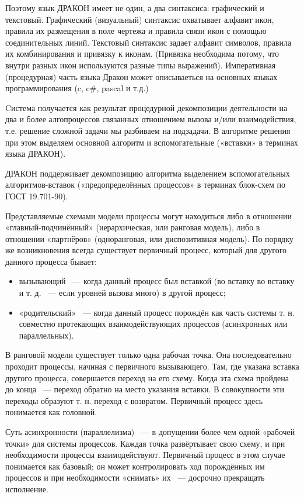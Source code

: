 Поэтому язык ДРАКОН имеет не один, а два синтаксиса: графический и текстовый.
Графический (визуальный) синтаксис охватывает алфавит икон, правила их размещения в поле чертежа и правила связи икон с помощью соединительных линий. Текстовый синтаксис задает алфавит символов, правила их комбинирования и привязку к иконам. (Привязка необходима потому, что внутри разных икон используются разные типы выражений). Императивная (процедурная) часть языка Дракон может описываеться на основных языках программирования (c, c\#, pascal и т.д.)

Cистема получается как результат процедурной декомпозиции деятельности на два и более алгопроцессов связанных отношением вызова и/или взаимодействия, т.е. решение сложной задачи мы разбиваем на подзадачи. В алгоритме решения при этом выделяем основной алгоритм и вспомогательные («вставки» в терминах языка ДРАКОН).

ДРАКОН поддерживает декомпозицию алгоритма выделением вспомогательных алгоритмов-вставок («предопределённых процессов» в терминах блок-схем по ГОСТ 19.701-90).

Представляемые схемами модели процессы могут находиться либо в отношении «главный-подчинённый» (иерархическая, или ранговая модель), либо в отношении «партнёров» (одноранговая, или диспозитивная модель). По порядку же возникновения всегда существует первичный процесс, который для другого данного процесса бывает:
\begin{itemize}
\item вызывающий ~--- когда данный процесс был вставкой (во вставку во вставку и т. д. ~--- если уровней вызова много) в другой процесс;
\item «родительский» ~--- когда данный процесс порождён как часть системы т. н. совместно протекающих взаимодействующих процессов (асинхронных или параллельных).
\end{itemize}

В ранговой модели существует только одна рабочая точка. Она последовательно проходит процессы, начиная с первичного вызывающего. Там, где указана вставка другого процесса, совершается переход на его схему. Когда эта схема пройдена до конца ~--- переход обратно на место указания вставки. В совокупности эти переходы образуют т. н. переход с возвратом. Первичный процесс здесь понимается как головной.

Суть асинхронности (параллелизма) ~--- в допущении более чем одной «рабочей точки» для системы процессов. Каждая точка развёртывает свою схему, и при необходимости процессы взаимодействуют. Первичный процесс в этом случае понимается как базовый; он может контролировать ход порождённых им процессов и при необходимости «снимать» их ~--- досрочно прекращать исполнение.

